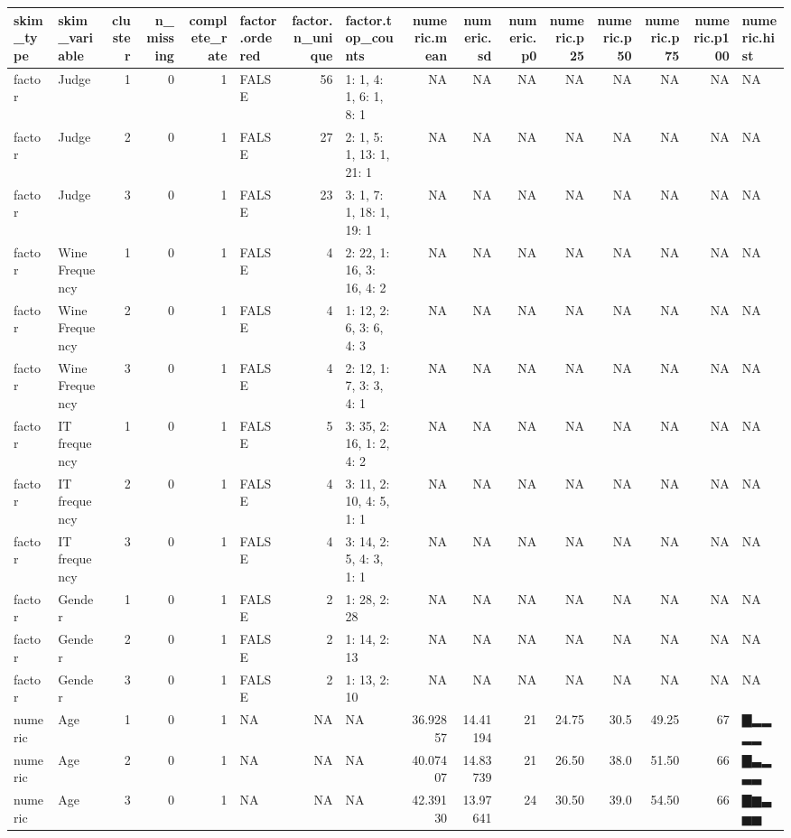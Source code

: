 \documentclass[
]{book}
\begin{document}
\begin{tabular}{l|l|r|r|r|l|r|l|r|r|r|r|r|r|r|l}
\hline
skim\_type & skim\_variable & cluster & n\_missing & complete\_rate & factor.ordered & factor.n\_unique & factor.top\_counts & numeric.mean & numeric.sd & numeric.p0 & numeric.p25 & numeric.p50 & numeric.p75 & numeric.p100 & numeric.hist\\
\hline
factor & Judge & 1 & 0 & 1 & FALSE & 56 & 1: 1, 4: 1, 6: 1, 8: 1 & NA & NA & NA & NA & NA & NA & NA & NA\\
\hline
factor & Judge & 2 & 0 & 1 & FALSE & 27 & 2: 1, 5: 1, 13: 1, 21: 1 & NA & NA & NA & NA & NA & NA & NA & NA\\
\hline
factor & Judge & 3 & 0 & 1 & FALSE & 23 & 3: 1, 7: 1, 18: 1, 19: 1 & NA & NA & NA & NA & NA & NA & NA & NA\\
\hline
factor & Wine Frequency & 1 & 0 & 1 & FALSE & 4 & 2: 22, 1: 16, 3: 16, 4: 2 & NA & NA & NA & NA & NA & NA & NA & NA\\
\hline
factor & Wine Frequency & 2 & 0 & 1 & FALSE & 4 & 1: 12, 2: 6, 3: 6, 4: 3 & NA & NA & NA & NA & NA & NA & NA & NA\\
\hline
factor & Wine Frequency & 3 & 0 & 1 & FALSE & 4 & 2: 12, 1: 7, 3: 3, 4: 1 & NA & NA & NA & NA & NA & NA & NA & NA\\
\hline
factor & IT frequency & 1 & 0 & 1 & FALSE & 5 & 3: 35, 2: 16, 1: 2, 4: 2 & NA & NA & NA & NA & NA & NA & NA & NA\\
\hline
factor & IT frequency & 2 & 0 & 1 & FALSE & 4 & 3: 11, 2: 10, 4: 5, 1: 1 & NA & NA & NA & NA & NA & NA & NA & NA\\
\hline
factor & IT frequency & 3 & 0 & 1 & FALSE & 4 & 3: 14, 2: 5, 4: 3, 1: 1 & NA & NA & NA & NA & NA & NA & NA & NA\\
\hline
factor & Gender & 1 & 0 & 1 & FALSE & 2 & 1: 28, 2: 28 & NA & NA & NA & NA & NA & NA & NA & NA\\
\hline
factor & Gender & 2 & 0 & 1 & FALSE & 2 & 1: 14, 2: 13 & NA & NA & NA & NA & NA & NA & NA & NA\\
\hline
factor & Gender & 3 & 0 & 1 & FALSE & 2 & 1: 13, 2: 10 & NA & NA & NA & NA & NA & NA & NA & NA\\
\hline
numeric & Age & 1 & 0 & 1 & NA & NA & NA & 36.92857 & 14.41194 & 21 & 24.75 & 30.5 & 49.25 & 67 & ▇▂▂▂▂\\
\hline
numeric & Age & 2 & 0 & 1 & NA & NA & NA & 40.07407 & 14.83739 & 21 & 26.50 & 38.0 & 51.50 & 66 & ▇▃▂▃▃\\
\hline
numeric & Age & 3 & 0 & 1 & NA & NA & NA & 42.39130 & 13.97641 & 24 & 30.50 & 39.0 & 54.50 & 66 & ▇▆▃▅▅\\
\hline
\end{tabular}
\end{document}

